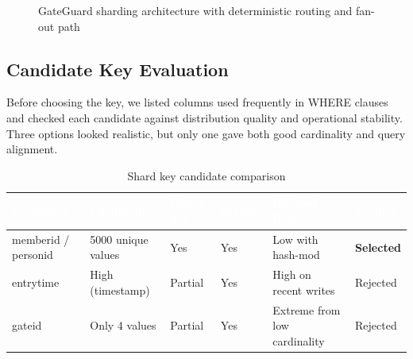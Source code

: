 \documentclass[a4paper,12pt]{article}
\newcommand{\tablehead}[1]{\textcolor{white}{\textbf{#1}}}
\begin{document}
\begin{figure}[H]
{
}
\caption{GateGuard sharding architecture with deterministic routing and fan-out path}
\label{fig:arch_overview}
\end{figure}

\subsection{Candidate Key Evaluation}

Before choosing the key, we listed columns used frequently in WHERE clauses and checked each candidate against distribution quality and operational stability. Three options looked realistic, but only one gave both good cardinality and query alignment.

\begin{table}[H]
\centering
\caption{Shard key candidate comparison}
\begin{tcolorbox}[tableframe,width=\textwidth,box align=center]
\scriptsize
{}
\begin{tabularx}{\textwidth}{L{2cm} L{2.1cm} L{1.45cm} L{1.2cm} Y L{1.35cm}}
\toprule
{}
\tablehead{Candidate} & \tablehead{Cardinality} & \tablehead{Query fit?} & \tablehead{Stable?} & \tablehead{Hotspot Risk} & \tablehead{Verdict} \\
\midrule
memberid / personid & 5000 unique values & Yes & Yes & Low with hash-mod & \textbf{Selected} \\
entrytime & High (timestamp) & Partial & Yes & High on recent writes & Rejected \\
gateid & Only 4 values & Partial & Yes & Extreme from low cardinality & Rejected \\
\bottomrule
\end{tabularx}
\end{tcolorbox}
\end{table}
\end{document}
